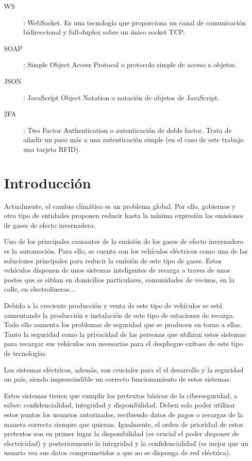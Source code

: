 \documentclass[12pt,a4paper,onecolumn,oneside]{report}
\newcommand{\mychapter}[2]{
	\setcounter{chapter}{#1}
	\setcounter{section}{1}
	\chapter*{#2}
	\addcontentsline{toc}{chapter}{#2}
}
\begin{document}
\begin{description}
	\item[WS]: WebSocket. Es una tecnología que proporciona un canal de comunicación bidireccional y full-duplex sobre un único socket TCP.
	\item[SOAP]: Simple Object Access Protocol o protocolo simple de acceso a objetos.
	\item[JSON]: JavaScript Object Notation o notación de objetos de JavaScript.
	\item[2FA]: Two Factor Authentication o autenticación de doble factor. Trata de añadir un paso más a una autenticación simple (en el caso de este trabajo una tarjeta RFID).




	
	
\end{description} 

\newpage
\renewcommand{\thepage}{\arabic{page}}
\setcounter{page}{1} %

\mychapter{0}{Introducción}
\label{Introducción}

Actualmente, el cambio climático es un problema global. Por ello, gobiernos y otro tipo de entidades proponen reducir hasta la mínima expresión las emisiones de gases de efecto invernadero.

Uno de los principales causantes de la emisión de los gases de efecto invernadero es la automoción. Para ello, se cuenta con los vehículos eléctricos como una de las soluciones principales para reducir la emisión de este tipo de gases. Estos vehículos disponen de unos sistemas inteligentes de recarga a traves de unos postes que se sitúan en domicilios particulares, comunidades de vecinos, en la calle, en electrolineras...

Debido a la creciente producción y venta de este tipo de vehículos se está aumentando la producción e instalación de este tipo de estaciones de recarga. Todo ello aumenta los problemas de seguridad que se producen en torno a ellas. Tanto la seguridad como la privacidad de las personas que utilizan estos sistemas para recargar sus vehículos son necesarias para el despliegue exitoso de este tipo de tecnologías.

Los sistemas eléctricos, además, son cruciales para el el desarrollo y la seguridad un país, siendo imprescindible un correcto funcionamiento de estos sistemas. 

Estos sistemas tienen que cumplir los pretextos básicos de la ciberseguridad, a saber: confidencialidad, integridad y disponibilidad. Deben solo poder utilizar estos puntos los usuarios autorizados, recibiendo datos de pagos o recargas de la manera correcta siempre que quieran. Igualmente, el orden de prioridad de estos pretextos son en primer lugar la disponibilidad (es crucial el poder disponer de electricidad) y posteriormente la integridad y la confidencialidad (es mejor que un usuario vea sus datos comprometidos a que no se disponga de red eléctrica).
\end{document}
